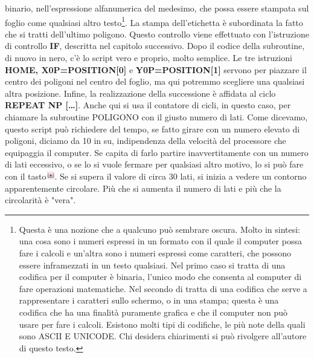  binario, nell'espressione alfanumerica del medesimo, che possa essere stampata
 sul foglio come qualsiasi altro testo\footnote{Questa è una nozione che a
 qualcuno può sembrare oscura. Molto in sintesi: una cosa sono i numeri
 espressi in un formato con il quale il computer possa fare i calcoli e
 un'altra sono i numeri espressi come caratteri, che possono essere
 inframezzati in un testo qualsiasi. Nel primo caso si tratta di una codifica
 per il computer è binaria, l'unico modo che consenta al computer di fare
 operazioni matematiche. Nel secondo di tratta di una codifica che serve a
 rappresentare i caratteri sullo schermo, o in una stampa; questa è una
 codifica che ha una finalità puramente grafica e che il computer non può usare
 per fare i calcoli. Esistono molti tipi di codifiche, le più note della quali
 sono ASCII E UNICODE. Chi desidera chiarimenti si può rivolgere all'autore di
 questo testo.}. La stampa dell'etichetta è subordinata
 la fatto che si tratti dell'ultimo poligono. Questo controllo viene effettuato
 con l'istruzione di controllo \textbf{IF}, descritta nel capitolo successivo.
 Dopo il codice della subroutine, di nuovo in nero, c'è lo script vero e
 proprio, molto semplice. Le tre istruzioni \textbf{HOME, X0P=POSITION[0]} e
 \textbf{Y0P=POSITION[1]} servono per piazzare il centro dei poligoni nel
 centro del foglio, ma qui potremmo scegliere una qualsiasi altra posizione.
 Infine, la realizzazione della successione è affidata al ciclo
 \textbf{REPEAT NP […]}. Anche qui si usa il contatore di cicli, in questo
 caso, per chiamare la subroutine POLIGONO con il giusto numero di lati. Come
 dicevamo, questo script può richiedere del tempo, se fatto girare con un
 numero elevato di poligoni, diciamo da 10 in su, indipendenza della velocità
 del processore che equipaggia il computer. Se capita di farlo partire
 inavvertitamente con un numero di lati eccessivo, o se lo si vuole fermare per
 qualsiasi altro motivo, lo si può fare con il
 tasto\includegraphics[height=1em]{./images/ripetere/StopLO.png}. Se si supera il valore di circa 30 lati, si inizia a vedere un contorno apparentemente circolare. Più che si aumenta il numero di lati e più che la circolarità è "vera".


\vskip 1cm

